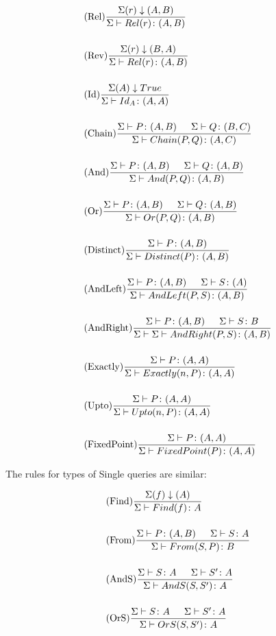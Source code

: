 \documentclass[12pt,a4paper,twoside,openright]{report}
\newcommand{\typeRule}[2]{\Sigma\vdash #1 \colon #2}
\begin{document}
\begin{align}
&\displaystyle\mbox{(Rel)}\frac{\Sigma(r)\downarrow(A, B)}{\typeRule{Rel(r)}{(A, B)}} \\[3ex]
&\displaystyle\mbox{(Rev)}\frac{\Sigma(r)\downarrow(B, A)}{\typeRule{Rel(r)}{(A, B)}} \\[3ex]
&\displaystyle\mbox{(Id)}\frac{\Sigma(A)\downarrow True}{\typeRule{Id_A}{(A, A)}} \\[3ex]
&\displaystyle\mbox{(Chain)}\frac{\typeRule{P}{(A, B)} \indent \typeRule{Q}{(B, C)}}{\typeRule{Chain(P, Q)}{(A, C)}} \\[3ex]
&\displaystyle\mbox{(And)}\frac{\typeRule{P}{(A, B)} \indent \typeRule{Q}{(A, B)}}{\typeRule{And(P, Q)}{(A, B)}} \\[3ex]
&\displaystyle\mbox{(Or)}\frac{\typeRule{P}{(A, B)} \indent \typeRule{Q}{(A, B)}}{\typeRule{Or(P, Q)}{(A, B)}} \\[3ex]
&\displaystyle\mbox{(Distinct)}\frac{\typeRule{P}{(A, B)}}{\typeRule{Distinct(P)}{(A, B)}} \\[3ex]
&\displaystyle\mbox{(AndLeft)}\frac{\typeRule{P}{(A, B)} \indent \typeRule{S}{(A)}}{\typeRule{AndLeft(P,S)}{(A, B)}} \\[3ex]
&\displaystyle\mbox{(AndRight)}\frac{\typeRule{P}{(A, B)} \indent \typeRule{S}{B}}{\Sigma \vdash \typeRule{AndRight(P, S)}{(A, B)}} \\[3ex]
&\displaystyle\mbox{(Exactly)}\frac{\typeRule{P}{(A, A)}}{\typeRule{Exactly(n, P)}{(A, A)}} \\[3ex]
&\displaystyle\mbox{(Upto)}\frac{\typeRule{P}{(A, A)}}{\typeRule{Upto(n, P)}{(A, A)}} \\[3ex]
&\displaystyle\mbox{(FixedPoint)}\frac{\typeRule{P}{(A, A)}}{\typeRule{FixedPoint(P)}{(A, A)}}
\end{align}


The rules for types of Single queries are similar:

\begin{align}
&\displaystyle\mbox{(Find)}\frac{\Sigma(f)\downarrow(A)}{\typeRule{Find(f)}{A}} \\[3ex]
&\displaystyle\mbox{(From)}\frac{\typeRule{P}{(A, B)} \indent \typeRule{S}{A}}{\typeRule{From(S, P)}{B}} \\[3ex]
&\displaystyle\mbox{(AndS)}\frac{  \typeRule{S}{A} \indent  \typeRule{S'}{A}}{\typeRule{AndS(S, S')}{A}} \\[3ex]
&\displaystyle\mbox{(OrS)}\frac{  \typeRule{S}{A} \indent  \typeRule{S'}{A}}{\typeRule{OrS(S, S')}{A}}
\end{align}
\end{document}
